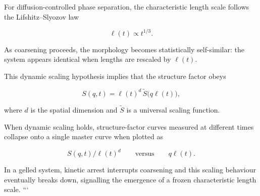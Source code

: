 \documentclass[11pt,a4paper]{article}
\begin{document}
For diffusion-controlled phase separation, the characteristic length scale follows the Lifshitz--Slyozov law

\begin{equation}
\ell(t)
\propto
t^{1/3}.
\end{equation}

As coarsening proceeds, the morphology becomes statistically self-similar: the system appears identical when lengths are rescaled by $\ell(t)$.

This dynamic scaling hypothesis implies that the structure factor obeys

\begin{equation}
S(q,t)
=
\ell(t)^d
\,\widetilde S
\bigl(q\ell(t)\bigr),
\label{eq:scaling}
\end{equation}

where $d$ is the spatial dimension and $\widetilde S$ is a universal scaling function.

When dynamic scaling holds, structure-factor curves measured at different times collapse onto a single master curve when plotted as

\[
S(q,t)/\ell(t)^d
\qquad \text{versus} \qquad
q\ell(t).
\]

In a gelled system, kinetic arrest interrupts coarsening and this scaling behaviour eventually breaks down, signalling the emergence of a frozen characteristic length scale.
``` 
\end{document}
